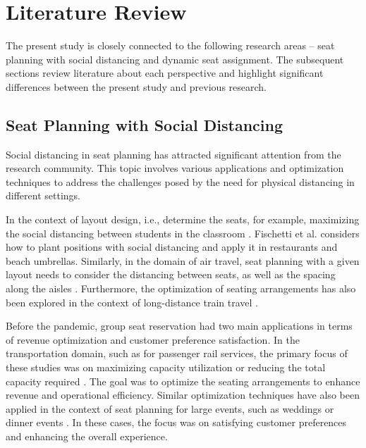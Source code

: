\section{Literature Review}

The present study is closely connected to the following research areas -- seat planning with social distancing and dynamic seat assignment. The subsequent sections review literature about each perspective and highlight significant differences between the present study and previous research.


\subsection{Seat Planning with Social Distancing}
Social distancing in seat planning has attracted significant attention from the research community. This topic involves various applications and optimization techniques to address the challenges posed by the need for physical distancing in different settings. 


In the context of layout design, i.e., determine the seats, for example, maximizing the social distancing between students in the classroom \cite{bortolete2022support}. Fischetti et al.\cite{fischetti2021safe} considers how to plant positions with social distancing and apply it in restaurants and beach umbrellas. Similarly, in the domain of air travel, seat planning with a given layout needs to consider the distancing between seats, as well as the spacing along the aisles \cite{ghorbani2020model, salari2022social}. Furthermore, the optimization of seating arrangements has also been explored in the context of long-distance train travel \cite{haque2022optimization}.  

Before the pandemic, group seat reservation had two main applications in terms of revenue optimization and customer preference satisfaction. In the transportation domain, such as for passenger rail services, the primary focus of these studies was on maximizing capacity utilization or reducing the total capacity required \cite{clausen2010off, deplano2019offline}. The goal was to optimize the seating arrangements to enhance revenue and operational efficiency. Similar optimization techniques have also been applied in the context of seat planning for large events, such as weddings or dinner events \cite{lewis2016creating}. In these cases, the focus was on satisfying customer preferences and enhancing the overall experience.


